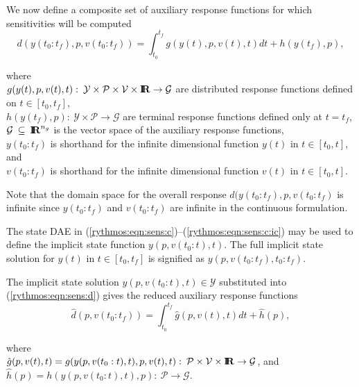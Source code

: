 \documentclass[pdf,ps2pdf,11pt]{SANDreport}
\begin{document}
We now define a composite set of auxiliary response functions for which
sensitivities will be computed
%
\begin{equation}
d(y(t_0:t_f),p,v(t_0:t_f))
= \int_{t_0}^{t_f} g(y(t),p,v(t),t) dt + h(y(t_f),p),
\label{rythmos:eqn:sens:d}
\end{equation}
\begin{tabbing}
\hspace{4ex}where\hspace{1ex}\= \\
\>	$g(y(t),p,v(t),t) : \:
		\mathcal{Y} \times \mathcal{P} \times \mathcal{V} \times \mbox{\textbf{I}}\hspace{-0.6ex}\mbox{\textbf{R}}
		\rightarrow \mathcal{G}$ are distributed response functions defined on $t\in[t_0,t_f]$, \\
\>	$h(y(t_f),p) : \: \mathcal{Y} \times \mathcal{P}
		\rightarrow \mathcal{G}$ are terminal response functions defined only at $t=t_f$, \\
\>	$\mathcal{G} \:\subseteq\:\mbox{\textbf{I}}\hspace{-0.6ex}\mbox{\textbf{R}}^{n_g}$ is the vector space of the auxiliary response functions, \\
\>	$y(t_0:t_f)$ is shorthand for the infinite dimensional function $y(t)$ in $t\in[t_0,t]$, and \\
\>	$v(t_0:t_f)$ is shorthand for the infinite dimensional function $v(t)$ in $t\in[t_0,t]$.
\end{tabbing}

Note that the domain space for the overall response
$d(y(t_0:t_f),p,v(t_0:t_f)$ is infinite since $y(t_0:t_f)$ and
$v(t_0:t_f)$ are infinite in the continuous formulation.

The state DAE in
(\ref{rythmos:eqn:sens:c})--(\ref{rythmos:eqn:sens:c:ic}) may be used
to define the implicit state function $y(p,v(t_0:t),t)$.  The full
implicit state solution for $y(t)$ in $t\in[t_0,t_f]$ is signified as
$y(p,v(t_0:t_f),t_0:t_f)$.

The implicit state solution $y(p,v(t_0:t),t)\in\mathcal{Y}$ substituted into
(\ref{rythmos:eqn:sens:d}) gives the reduced auxiliary response functions
%
\begin{equation}
\hat{d}(p,v(t_0:t_f))
= \int_{t_0}^{t_f} \hat{g}(p,v(t),t) dt + \hat{h}(p),
\label{rythmos:eqn:sens:d_hat}
\end{equation}
\begin{tabbing}
\hspace{4ex}where\hspace{1ex}\= \\
\>	$\hat{g}(p,v(t),t) = g(y(p,v(t_0:t),t),p,v(t),t) : \:
		\mathcal{P} \times \mathcal{V} \times \mbox{\textbf{I}}\hspace{-0.6ex}\mbox{\textbf{R}}	\rightarrow \mathcal{G}$, and \\
\>	$\hat{h}(p) = h(y(p,v(t_0:t),t),p) : \: \mathcal{P}	\rightarrow \mathcal{G}$.
\end{tabbing}
\end{document}
